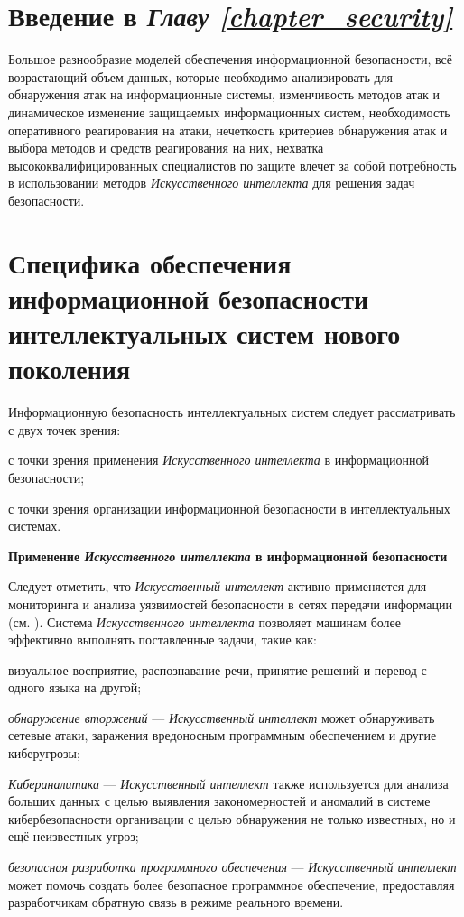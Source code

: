 \section*{Введение в \textit{Главу \ref{chapter_security}}}
Большое разнообразие моделей обеспечения информационной безопасности, всё возрастающий объем данных, которые необходимо анализировать для обнаружения атак на информационные системы, изменчивость методов атак и динамическое изменение защищаемых информационных систем, необходимость оперативного реагирования на атаки, нечеткость критериев обнаружения атак и выбора методов и средств реагирования на них, нехватка высококвалифицированных специалистов по защите влечет за собой потребность в использовании методов \textit{Искусственного интеллекта} для решения задач безопасности.

\section{Специфика обеспечения информационной безопасности интеллектуальных систем нового поколения}
\label{sec_security_specifics}
Информационную безопасность интеллектуальных систем следует рассматривать с двух точек зрения:
\begin{textitemize}
	\item с точки зрения применения \textit{Искусственного интеллекта} в информационной безопасности;
	\item с точки зрения организации информационной безопасности в интеллектуальных системах.
\end{textitemize}

\textbf{Применение \textit{Искусственного интеллекта} в информационной безопасности}

Следует отметить, что \textit{Искусственный интеллект} активно применяется для мониторинга и анализа уязвимостей безопасности в сетях передачи информации (см. ). Система \textit{Искусственного интеллекта} позволяет машинам более эффективно выполнять поставленные задачи, такие как:

\begin{textitemize}
	\item визуальное восприятие, распознавание речи, принятие решений и перевод с одного языка на другой;
	
	\item \textit{обнаружение вторжений} --- \textit{Искусственный интеллект} может обнаруживать сетевые атаки, заражения вредоносным программным обеспечением и другие киберугрозы;
	
	\item \textit{Кибераналитика} --- \textit{Искусственный интеллект} также используется для анализа больших данных с целью выявления закономерностей и аномалий в системе кибербезопасности организации с целью обнаружения не только известных, но и ещё неизвестных угроз;
	
	\item \textit{безопасная разработка программного обеспечения} --- \textit{Искусственный интеллект} может помочь создать более безопасное программное обеспечение, предоставляя разработчикам обратную связь в режиме реального времени.
\end{textitemize}

